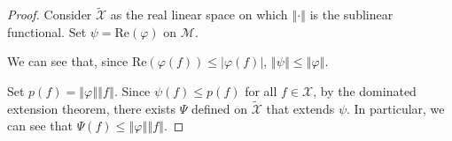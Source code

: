 \documentclass[10pt]{extarticle}
\newcommand{\norm}[1]{\left\Vert #1\right\Vert}
\theoremstyle{plain}
\theoremstyle{definition}
\theoremstyle{note}
\renewcommand{\newline}{\hfill\break}
\begin{document}
\begin{proof}
  Consider $\tilde{\mathcal{X}}$ as the real linear space on which $\norm{\cdot}$ is the sublinear functional. Set $\psi = \text{Re}\left(\varphi\right)$ on $\mathcal{M}$.\newline

  We can see that, since $\text{Re}\left(\varphi(f)\right) \leq |\varphi(f)|$, $\norm{\psi}\leq \norm{\varphi}$.\newline

  Set $p(f) = \norm{\varphi}\norm{f}$. Since $\psi(f) \leq p(f)$ for all $f\in \mathcal{X}$, by the dominated extension theorem, there exists $\Psi$ defined on $\tilde{\mathcal{X}}$ that extends $\psi$. In particular, we can see that $\Psi(f) \leq \norm{\varphi}\norm{f}$.\newline


\end{proof}
\end{document}
